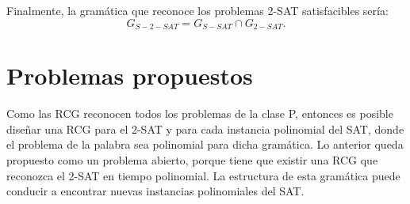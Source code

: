 \documentclass{article}
\begin{document}
Finalmente, la gramática que reconoce los problemas 2-SAT satisfacibles sería:
$$G_{S-2-SAT}=G_{S-SAT}\cap G_{2-SAT}.$$

\section{Problemas propuestos}

Como las RCG reconocen todos los problemas de la clase P, entonces es posible diseñar una RCG para el 2-SAT y para cada instancia polinomial del SAT, donde el problema de la palabra sea polinomial para dicha gramática.  Lo anterior queda propuesto como un problema abierto, porque tiene que existir una RCG que reconozca el 2-SAT en tiempo polinomial. La estructura de esta gramática puede conducir a encontrar nuevas instancias polinomiales del SAT.
\end{document}
